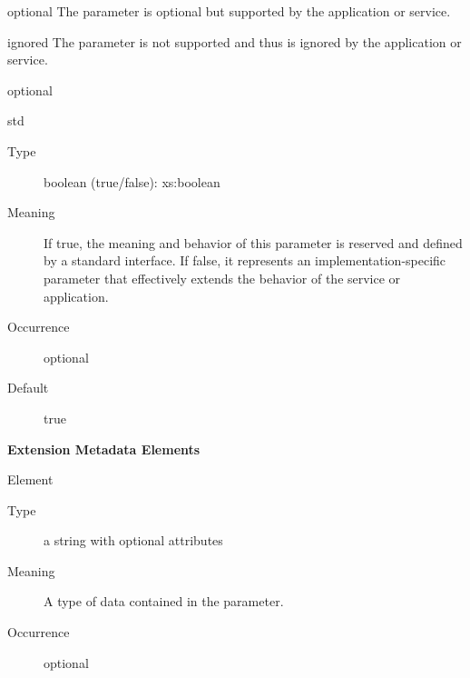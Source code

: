 \documentclass[11pt,a4paper]{ivoa}
\begin{document}
\begin{generated}
\begin{bigdescription}
\begin{description}
\begin{longtermsdescription}
\item[optional]
                  The parameter is optional but supported by the application or
                  service.

\item[ignored]
                  The parameter is not supported and thus is ignored by the
                  application or service.

\end{longtermsdescription}
\item[Default] optional
\end{description}
\item[std]
\begin{description}
\item[Type] boolean (true/false): xs:boolean
\item[Meaning]
                     If true, the meaning and behavior of this parameter is
                     reserved and defined by a standard interface.  If
                     false, it represents an implementation-specific
                     parameter that effectively extends the behavior of the
                     service or application.

\item[Occurrence] optional
\item[Default] true
\end{description}


\end{bigdescription}\endgroup



\vspace{0.5ex}\noindent\textbf{ Extension Metadata Elements}

\begingroup\small\begin{bigdescription}\item[Element \xmlel{dataType}]
\begin{description}
\item[Type] a string with optional attributes
\item[Meaning]
                        A type of data contained in the parameter.

\item[Occurrence] optional

\end{description}


\end{bigdescription}\endgroup

\endgroup
\end{generated}
\end{document}
